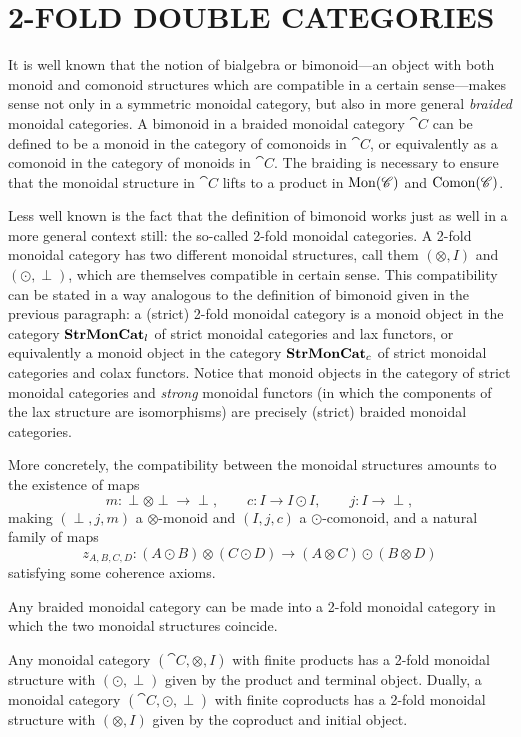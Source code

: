 
\chapter{2-FOLD DOUBLE CATEGORIES}\label{Ch:2Fold}


It is well known that the notion of bialgebra or bimonoid---an object with both monoid and comonoid structures which are compatible in a certain sense---makes sense not only in a symmetric monoidal category, but also in more general \emph{braided} monoidal categories. A bimonoid in a braided monoidal category $\cat{C}$ can be defined to be a monoid in the category of comonoids in $\cat{C}$, or equivalently as a comonoid in the category of monoids in $\cat{C}$. The braiding is necessary to ensure that the monoidal structure in $\cat{C}$ lifts to a product in $\mathrm{Mon}(\mathscr{C})$ and $\mathrm{Comon}(\mathscr{C})$.

Less well known is the fact that the definition of bimonoid works just as well in a more general context still: the so-called 2-fold monoidal categories. A 2-fold monoidal category has two different monoidal structures, call them $(\otimes,I)$ and $(\odot,\perp)$, which are themselves compatible in certain sense. This compatibility can be stated in a way analogous to the definition of bimonoid given in the previous paragraph: a (strict) 2-fold monoidal category is a monoid object in the category $\mathbf{StrMonCat}_l$ of strict monoidal categories and lax functors, or equivalently a monoid object in the category $\mathbf{StrMonCat}_c$ of strict monoidal categories and colax functors. Notice that monoid objects in the category of strict monoidal categories and \emph{strong} monoidal functors (in which the components of the lax structure are isomorphisms) are precisely (strict) braided monoidal categories.

More concretely, the compatibility between the monoidal structures amounts to the existence of maps
\[
	m\colon \perp\otimes\perp\to\perp, \qquad c\colon I\to I\odot I, \qquad j\colon I\to \perp,
\]
making $(\perp,j,m)$ a $\otimes$-monoid and $(I,j,c)$ a $\odot$-comonoid, and a natural family of maps
\[
	z_{A,B,C,D}\colon (A\odot B)\otimes(C\odot D) \to (A\otimes C)\odot(B\otimes D)
\]
satisfying some coherence axioms.

\begin{example}\leavevmode
\begin{compactitem}
	\item Any braided monoidal category can be made into a 2-fold monoidal category in which the two monoidal structures coincide.
	\item Any monoidal category $(\cat{C},\otimes,I)$ with finite products has a 2-fold monoidal structure with $(\odot,\perp)$ given by the product and terminal object. Dually, a monoidal category $(\cat{C},\odot,\perp)$ with finite coproducts has a 2-fold monoidal structure with $(\otimes,I)$ given by the coproduct and initial object.
\end{compactitem}
\end{example}

